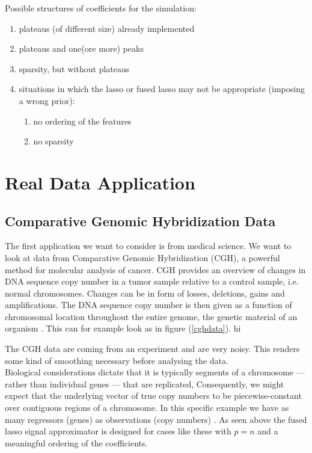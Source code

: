 \documentclass{article}
\theoremstyle{definition}
\begin{document}
Possible structures of coefficients for the simulation:
\begin{enumerate}
	\item plateaus (of different size) already implemented
	\item plateaus and one(ore more) peaks
	\item sparsity, but without plateaus
	\item situations in which the lasso or fused lasso may not be appropriate (imposing a wrong prior):
	\begin{enumerate}
		\item no ordering of the features
		\item no sparsity
	\end{enumerate}
\end{enumerate}



\section{Real Data Application}

\subsection{Comparative Genomic Hybridization Data}
The first application we want to consider is from medical science. We want to look at data from Comparative Genomic Hybridization (CGH), a powerful method for molecular analysis of cancer.    
CGH provides an overview of changes in DNA sequence copy number in a tumor sample 
relative to a control sample, i.e. normal chromosomes. Changes can be in form of losses, deletions, gains and amplifications\citep{cghmain}. The DNA  sequence copy number is then given as a function of chromosomal location throughout the entire genome, the genetic material of an organism \citep{cghsecond}. This can for example look as in figure (\ref{cghdata}).
hi

The CGH data are coming from an experiment and are very noisy. This renders some kind of smoothing necessary before analysing the data. \\
Biological considerations dictate that it is typically segments of a chromosome — rather than individual genes — that are replicated, Consequently, we might expect that the underlying vector of true copy numbers to be piecewise-constant over contiguous regions of a chromosome.
In this specific example we have as many regressors (genes) as observations (copy numbers) \citep{sparsity}.
As seen above the fused lasso signal approximator is designed for cases like these with $ p = n$ and a meaningful ordering of the coefficients.
\end{document}
